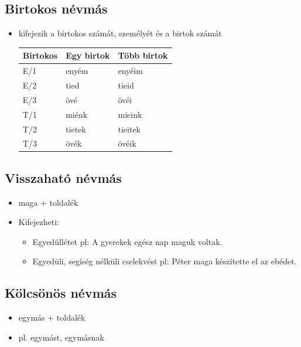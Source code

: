 \documentclass{article}
\begin{document}
\subsection{Birtokos névmás}
\begin{itemize}
    \item kifejezik a birtokos számát, személyét és a birtok számát
    \\ \begin{tabular}{|l|l|l|}
\hline
Birtokos & Egy birtok & Több birtok \\ \hline
E/1 & enyém & enyéim \\ \hline
E/2 & tied & tieid  \\ \hline
E/3 & övé & övéi \\ \hline
T/1 & miénk  & mieink \\ \hline
T/2 & tietek & tieitek \\ \hline
T/3 & övék & övéik \\ \hline
\end{tabular}
\end{itemize}

\subsection{Visszaható névmás}
\begin{itemize}
    \item maga + toldalék
    \item Kifejezheti: \begin{itemize}
        \item Egyedüllétet pl: A gyerekek egész nap maguk voltak.
        \item Egyedüli, segíség nélküli cselekvést pl: Péter maga készítette el az ebédet. 
    \end{itemize}
\end{itemize}

\subsection{Kölcsönös névmás}
\begin{itemize}
    \item egymás + toldalék
    \item pl. egymást, egymásnak
\end{itemize}

\newpage
\end{document}
